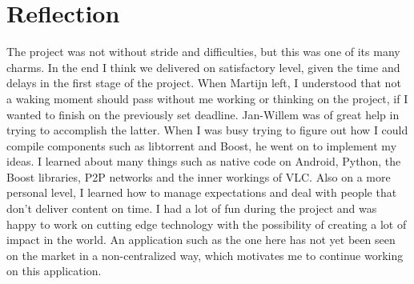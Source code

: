 \section{Reflection}
\thispagestyle{fancy}
The project was not without stride and difficulties, but this was one of its many charms. In the end I think we delivered on satisfactory level, given the time and delays in the first stage of the project. When Martijn left, I understood that not a waking moment should pass without me working or thinking on the project, if I wanted to finish on the previously set deadline. Jan-Willem was of great help in trying to accomplish the latter. When I was busy trying to figure out how I could compile components such as libtorrent and Boost, he went on to implement my ideas. 
I learned about many things such as native code on Android, Python, the Boost libraries, P2P networks and the inner workings of VLC. Also on a more personal level, I learned how to manage expectations and deal with people that don't deliver content on time. 
I had a lot of fun during the project and was happy to work on cutting edge technology with the possibility of creating a lot of impact in the world. An application such as the one here has not yet been seen on the market in a non-centralized way, which motivates me to continue working on this application. 